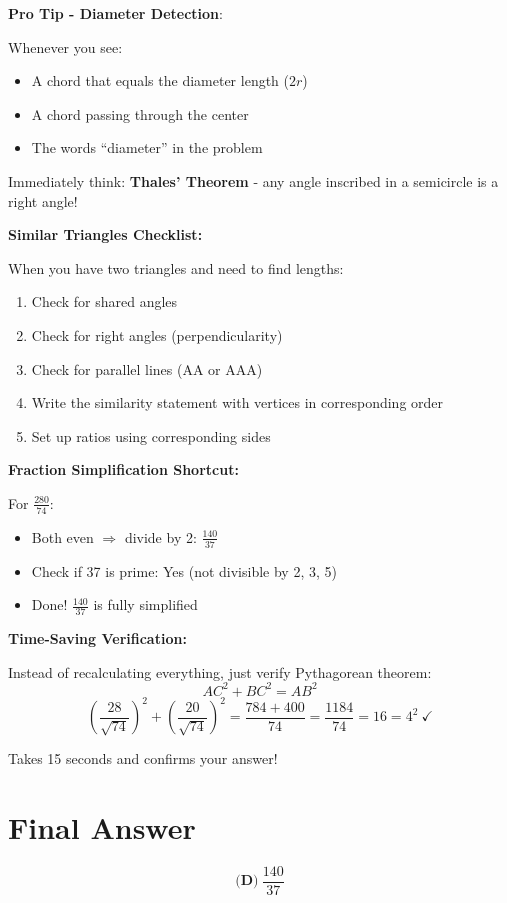 \documentclass[]{article}
\begin{document}
\begin{tipbox}
\textbf{Pro Tip - Diameter Detection}:

Whenever you see:
\begin{itemize}
    \item A chord that equals the diameter length ($2r$)
    \item A chord passing through the center
    \item The words ``diameter'' in the problem
\end{itemize}

Immediately think: \textbf{Thales' Theorem} - any angle inscribed in a semicircle is a right angle!

\textbf{Similar Triangles Checklist:}

When you have two triangles and need to find lengths:
\begin{enumerate}
    \item Check for shared angles
    \item Check for right angles (perpendicularity)
    \item Check for parallel lines (AA or AAA)
    \item Write the similarity statement with vertices in corresponding order
    \item Set up ratios using corresponding sides
\end{enumerate}

\textbf{Fraction Simplification Shortcut:}

For $\frac{280}{74}$:
\begin{itemize}
    \item Both even $\Rightarrow$ divide by 2: $\frac{140}{37}$
    \item Check if 37 is prime: Yes (not divisible by 2, 3, 5)
    \item Done! $\frac{140}{37}$ is fully simplified
\end{itemize}

\textbf{Time-Saving Verification:}

Instead of recalculating everything, just verify Pythagorean theorem:
\[AC^2 + BC^2 = AB^2\]
\[\left(\frac{28}{\sqrt{74}}\right)^2 + \left(\frac{20}{\sqrt{74}}\right)^2 = \frac{784 + 400}{74} = \frac{1184}{74} = 16 = 4^2\ \checkmark\]

Takes 15 seconds and confirms your answer!
\end{tipbox}

\section*{Final Answer}
\[\boxed{\textbf{(D)}\ \frac{140}{37}}\]
\end{document}
